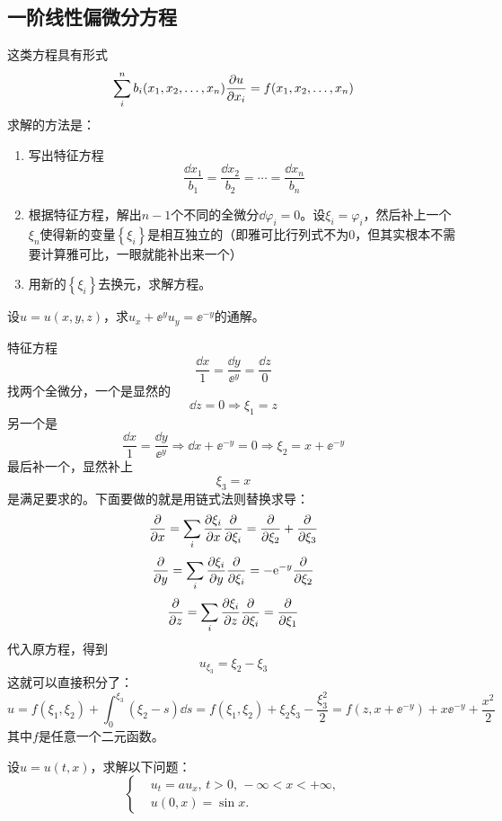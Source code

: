 \subsection{一阶线性偏微分方程}
这类方程具有形式
\[\sum_{i}^{n} b_i(x_1, x_2, \dots, x_n) \pdv{u}{x_i} = f(x_1, x_2, \dots, x_n)\]
求解的方法是：
\begin{enumerate}
    \item 写出\color{red}特征方程
        \[\frac{\dd{x_1}}{b_1} = \frac{\dd{x_2}}{b_2} = \cdots = \frac{\dd{x_n}}{b_n}\]
        \color{black}
    \item 根据特征方程，解出$n - 1$个不同的全微分$\dd{\varphi_i} = 0$。设$\xi_i = \varphi_i$，然后补上一个$\xi_n$使得新的变量$\left\{\xi_i\right\}$是相互独立的（即雅可比行列式不为0，但其实根本不需要计算雅可比，一眼就能补出来一个）
    \item 用新的$\left\{\xi_i\right\}$去换元，求解方程。
\end{enumerate}
\begin{problembox}
    \begin{example}
        设$u = u(x, y, z)$，求$u_x + \ee^y u_y = \ee^{-y}$的通解。
    \end{example}
    \begin{solution}
        特征方程
        \[\frac{\dd{x}}{1} = \frac{\dd{y}}{\ee^y} = \frac{\dd{z}}{0}\]
        找两个全微分，一个是显然的
        \[\dd{z} = 0 \Rightarrow \xi_1 = z\]
        另一个是
        \[\frac{\dd{x}}{1} = \frac{\dd{y}}{\ee^y} \Rightarrow \dd{x + \ee^{-y}} = 0 \Rightarrow \xi_2 = x + \ee^{-y}\]
        最后补一个，显然补上
        \[\xi_3 = x\]
        是满足要求的。下面要做的就是用链式法则替换求导：
        \[\pdv{}{x} = \sum_{i} \pdv{\xi_i}{x}\pdv{}{\xi_i} = \pdv{}{\xi_2} + \pdv{}{\xi_3}\]
        \[\pdv{}{y} = \sum_{i} \pdv{\xi_i}{y}\pdv{}{\xi_i} = -\mathrm{e}^{-y}\pdv{}{\xi_2}\]
        \[\pdv{}{z} = \sum_{i} \pdv{\xi_i}{z}\pdv{}{\xi_i} = \pdv{}{\xi_1}\]
        代入原方程，得到
        \[u_{\xi_3} = \xi_2 - \xi_3\]
        这就可以直接积分了：
        \[u = f(\xi_1, \xi_2) + \int_{0}^{\xi_3}\left(\xi_2 - s\right) \dd{s} = f\left(\xi_1, \xi_2\right) + \xi_2 \xi_3 - \frac{\xi_3^2}{2} = f(z, x + \ee^{-y}) + x \ee^{-y} + \frac{x^2}{2}\]
        其中$f$是任意一个二元函数。
    \end{solution}
\end{problembox}
\begin{problembox}
    \begin{exercise}
        设$u = u\left(t, x\right)$，求解以下问题：
        \begin{equation*}
            \left\{
                \begin{aligned}
                    &u_t = a u_x,\, t >0,\, -\infty < x < +\infty, \\
                    &u(0, x) = \sin x.
                \end{aligned}
            \right.
        \end{equation*}
    \end{exercise}
\end{problembox}
